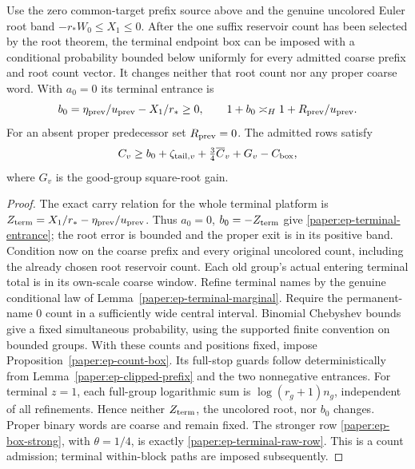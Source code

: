 \begin{proposition}
\label{paper:ep-terminal-admission}
Use the zero common-target prefix source above and the genuine
uncolored Euler root band
$-r_*W_0\leq X_1\leq0$.
After the one suffix reservoir count has been selected by the root
theorem, the terminal endpoint box can be imposed with a conditional
probability bounded below uniformly for every admitted coarse prefix
and root count vector.  It changes neither that root count nor any
proper coarse word.  With $a_0=0$ its terminal entrance is
\begin{equation}\label{paper:ep-terminal-entrance}
 b_0=\eta_{\rm prev}/u_{\rm prev}-X_1/r_*\geq0,
 \qquad 1+b_0\asymp_H1+R_{\rm prev}/u_{\rm prev}.
\end{equation}
For an absent proper predecessor set $R_{\rm prev}=0$.
The admitted rows satisfy
\begin{equation}\label{paper:ep-terminal-raw-row}
 C_v\geq b_0+\zeta_{{\rm tail},v}
                     +\tfrac34\overline C_v+G_v-C_{\rm box},
\end{equation}
where $G_v$ is the good-group square-root gain.
\end{proposition}
\begin{proof}
The exact carry relation for the whole terminal platform is
$Z_{\rm term}=X_1/r_*-\eta_{\rm prev}/u_{\rm prev}$.
Thus $a_0=0$, $b_0=-Z_{\rm term}$ give
\eqref{paper:ep-terminal-entrance}; the root error is bounded and
the proper exit is in its positive band.
Condition now on the coarse prefix and every original uncolored count,
including the already chosen root reservoir count.  Each old group's
actual entering terminal total is in its own-scale coarse window.
Refine terminal names by the genuine conditional law of
Lemma~\ref{paper:ep-terminal-marginal}.  Require the permanent-name
$0$ count in a sufficiently wide central interval.  Binomial
Chebyshev bounds give a fixed simultaneous probability, using the
supported finite convention on bounded groups.  With these counts
and positions fixed, impose Proposition~\ref{paper:ep-count-box}.
Its full-stop guards follow deterministically from
Lemma~\ref{paper:ep-clipped-prefix} and the two nonnegative entrances.
For terminal $z=1$, each full-group logarithmic sum is
$\log(r_g+1)n_g$, independent of all refinements.  Hence neither
$Z_{\rm term}$, the uncolored root, nor $b_0$ changes.  Proper binary
words are coarse and remain fixed.
The stronger row \eqref{paper:ep-box-strong}, with $\theta=1/4$,
is exactly \eqref{paper:ep-terminal-raw-row}.
This is a count admission; terminal within-block paths are imposed
subsequently.
\end{proof}
